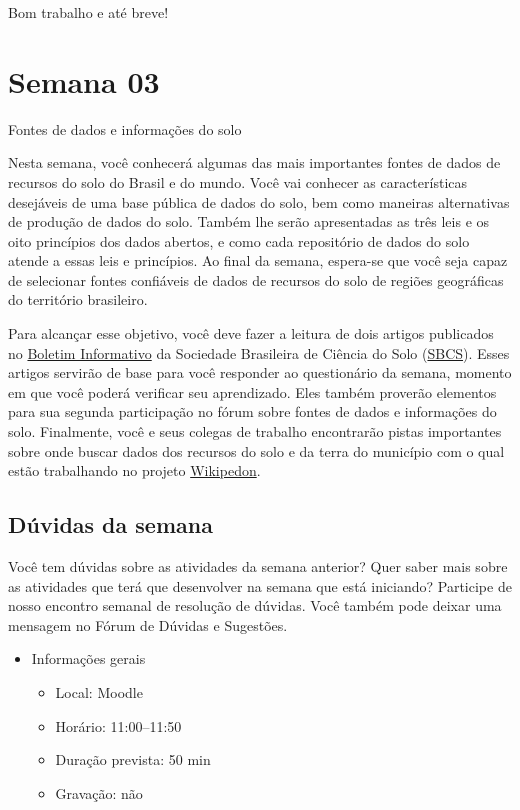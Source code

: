 \documentclass[
  11pt,
  a4paper,
  dvipsnames]{tufte-book}
\providecommand{\tightlist}{%
  \setlength{\itemsep}{0pt}\setlength{\parskip}{0pt}}
\begin{document}
Bom trabalho e até breve!

\hypertarget{semana-03}{%
\chapter{Semana 03}\label{semana-03}}

Fontes de dados e informações do solo

Nesta semana, você conhecerá algumas das mais importantes fontes de dados de recursos do solo do Brasil e do mundo. Você vai conhecer as características desejáveis de uma base pública de dados do solo, bem como maneiras alternativas de produção de dados do solo. Também lhe serão apresentadas as três leis e os oito princípios dos dados abertos, e como cada repositório de dados do solo atende a essas leis e princípios. Ao final da semana, espera-se que você seja capaz de selecionar fontes confiáveis de dados de recursos do solo de regiões geográficas do território brasileiro.

Para alcançar esse objetivo, você deve fazer a leitura de dois artigos publicados no \href{https://www.sbcs.org.br/?post_type=boletim}{Boletim Informativo} da Sociedade Brasileira de Ciência do Solo (\href{https://www.sbcs.org.br}{SBCS}). Esses artigos servirão de base para você responder ao questionário da semana, momento em que você poderá verificar seu aprendizado. Eles também proverão elementos para sua segunda participação no fórum sobre fontes de dados e informações do solo. Finalmente, você e seus colegas de trabalho encontrarão pistas importantes sobre onde buscar dados dos recursos do solo e da terra do município com o qual estão trabalhando no projeto \href{https://pt.wikiversity.org/wiki/Wikipedon}{Wikipedon}.

\hypertarget{duxfavidas-da-semana-1}{%
\section{Dúvidas da semana}\label{duxfavidas-da-semana-1}}

Você tem dúvidas sobre as atividades da semana anterior? Quer saber mais sobre as atividades que terá que desenvolver na semana que está iniciando? Participe de nosso encontro semanal de resolução de dúvidas. Você também pode deixar uma mensagem no Fórum de Dúvidas e Sugestões.

\begin{itemize}
\tightlist
\item
  Informações gerais

  \begin{itemize}
  \tightlist
  \item
    Local: Moodle
  \item
    Horário: 11:00--11:50
  \item
    Duração prevista: 50 min
  \item
    Gravação: não
  \end{itemize}
\end{itemize}
\end{document}
